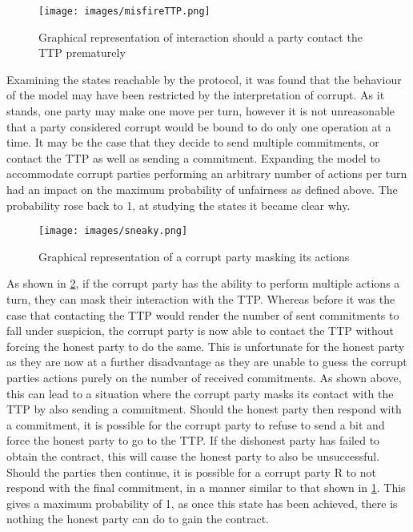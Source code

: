 \documentclass{l4proj}
\begin{document}
\begin{figure}[ht!]
\centering
\texttt{[image: images/misfireTTP.png]}
\caption{Graphical representation of interaction should a party contact the TTP prematurely}
\label{misfireTTP}
\end{figure}

Examining the states reachable by the protocol, it was found that the behaviour of the model may have been restricted by the interpretation of corrupt. As it stands, one party may make one move per turn, however it is not unreasonable that a party considered corrupt would be bound to do only one operation at a time. It may be the case that they decide to send multiple commitments, or contact the TTP as well as sending a commitment. Expanding the model to accommodate corrupt parties performing an arbitrary number of actions per turn had an impact on the maximum probability of unfairness as defined above. The probability rose back to 1, at studying the states it became clear why.

\begin{figure}[ht!]
\centering
\texttt{[image: images/sneaky.png]}
\caption{Graphical representation of a corrupt party masking its actions}
\label{sneak}
\end{figure}

As shown in \ref{sneak}, if the corrupt party has the ability to perform multiple actions a turn, they can mask their interaction with the TTP. Whereas before it was the case that contacting the TTP would render the number of sent commitments to fall under suspicion, the corrupt party is now able to contact the TTP without forcing the honest party to do the same. This is unfortunate for the honest party as they are now at a further disadvantage as they are unable to guess the corrupt parties actions purely on the number of received commitments. As shown above, this can lead to a situation where the corrupt party masks its contact with the TTP by also sending a commitment. Should the honest party then respond with a commitment, it is possible for the corrupt party to refuse to send a bit and force the honest party to go to the TTP. If the dishonest party has failed to obtain the contract, this will cause the honest party to also be unsuccessful. Should the parties then continue, it is possible for a corrupt party R to not respond with the final commitment, in a manner similar to that shown in \ref{misfireTTP}. This gives a maximum probability of 1, as once this state has been achieved, there is nothing the honest party can do to gain the contract. 
\end{document}
